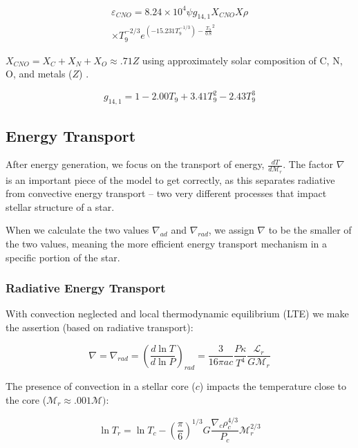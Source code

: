 \documentclass[twocolumn]{aastex631}
\begin{document}
\begin{equation}
\begin{split}
    \label{CNO}
    \varepsilon _{CNO} = 8.24 \times 10^{4} \psi g_{14,1} X_{CNO}X \rho \\
    \times T_9^{-2/3} e^{(-15.231T_9^{-1/3}) - \frac{T_9}{0.8}^2}
\end{split}
\end{equation}

$X_{CNO} = X_C + X_N + X_O \approx .71 Z$ using approximately solar composition of C, N, O, and metals ($Z$) \citep{opal}.

\begin{equation}
    \label{g14,1}
    g_{14,1} = 1 - 2.00T_9 + 3.41T_9^2 - 2.43T_9^3
\end{equation}

\subsection{Energy Transport}

After energy generation, we focus on the transport of energy, $\frac{d T}{d\mathcal{M}_r}$. The factor $\nabla$ is an important piece of the model to get correctly, as this separates radiative from convective energy transport -- two very different processes that impact stellar structure of a star.

When we calculate the two values $\nabla_{ad}$ and $\nabla_{rad}$, we assign $\nabla$ to be the smaller of the two values, meaning the more efficient energy transport mechanism in a specific portion of the star. 

\subsubsection{Radiative Energy Transport}

With convection neglected and local thermodynamic equilibrium (LTE) we make the assertion (based on radiative transport):

\begin{equation}
	\nabla = \nabla_{rad} = \left(\frac{d \ln{T}}{d \ln{P}}\right)_{rad} = \frac{3}{16\pi ac}\frac{P \kappa}{T^4}\frac{\mathcal{L}_r}{G\mathcal{M}_r}
\end{equation}

The presence of convection in a stellar core ($c$) impacts the temperature close to the core ($\mathcal{M}_r \approx .001\mathcal{M})$:

\begin{equation}
 	\ln{T_r} = \ln{T_c} - \left(\frac{\pi}{6}\right)^{1/3} G \frac{\nabla_c \rho_c^{4/3}}{P_c} \mathcal{M}_r^{2/3}
\end{equation}
\end{document}

